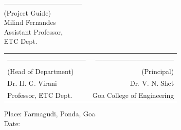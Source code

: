 \noindent -----------------------------------\\
(Project Guide)\\
Milind Fernandes\\
Assistant Professor,\\
ETC Dept.\\



\begin{table}[H]
\begin{tabular}{lr}
\noindent ----------------------------------- & \hspace{6cm} ----------------------------------- \\
(Head of Department) & (Principal)\\
Dr. H. G. Virani & Dr. V. N. Shet\\
Professor, ETC Dept. & Goa College of Engineering\\
\end{tabular}
\end{table}
\noindent Place: Farmagudi, Ponda, Goa\\
\noindent Date: 